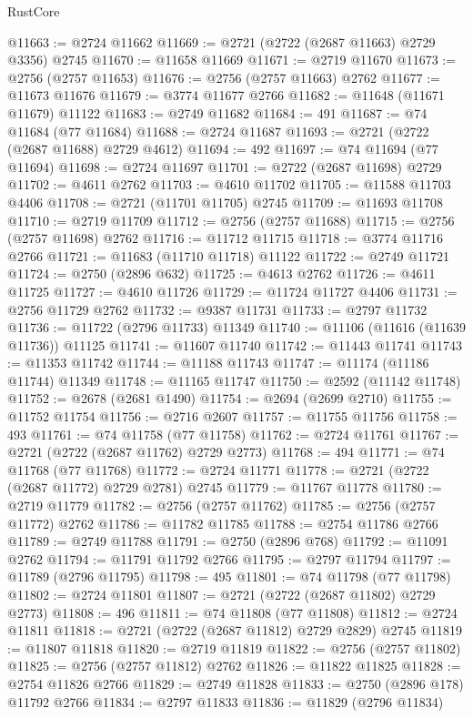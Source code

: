 \begin{lexlean}{RustCore}
\begin{coremodule}
@11663 := @2724 @11662
@11669 := @2721 (@2722 (@2687 @11663) @2729 @3356) @2745
@11670 := @11658 @11669
@11671 := @2719 @11670
@11673 := @2756 (@2757 @11653)
@11676 := @2756 (@2757 @11663) @2762
@11677 := @11673 @11676
@11679 := @3774 @11677 @2766
@11682 := @11648 (@11671 @11679) @11122
@11683 := @2749 @11682
@11684 := 491
@11687 := @74 @11684 (@77 @11684)
@11688 := @2724 @11687
@11693 := @2721 (@2722 (@2687 @11688) @2729 @4612)
@11694 := 492
@11697 := @74 @11694 (@77 @11694)
@11698 := @2724 @11697
@11701 := @2722 (@2687 @11698) @2729
@11702 := @4611 @2762
@11703 := @4610 @11702
@11705 := @11588 @11703 @4406
@11708 := @2721 (@11701 @11705) @2745
@11709 := @11693 @11708
@11710 := @2719 @11709
@11712 := @2756 (@2757 @11688)
@11715 := @2756 (@2757 @11698) @2762
@11716 := @11712 @11715
@11718 := @3774 @11716 @2766
@11721 := @11683 (@11710 @11718) @11122
@11722 := @2749 @11721
@11724 := @2750 (@2896 @632)
@11725 := @4613 @2762
@11726 := @4611 @11725
@11727 := @4610 @11726
@11729 := @11724 @11727 @4406
@11731 := @2756 @11729 @2762
@11732 := @9387 @11731
@11733 := @2797 @11732
@11736 := @11722 (@2796 @11733) @11349
@11740 := @11106 (@11616 (@11639 @11736)) @11125
@11741 := @11607 @11740
@11742 := @11443 @11741
@11743 := @11353 @11742
@11744 := @11188 @11743
@11747 := @11174 (@11186 @11744) @11349
@11748 := @11165 @11747
@11750 := @2592 (@11142 @11748)
@11752 := @2678 (@2681 @1490)
@11754 := @2694 (@2699 @2710)
@11755 := @11752 @11754
@11756 := @2716 @2607
@11757 := @11755 @11756
@11758 := 493
@11761 := @74 @11758 (@77 @11758)
@11762 := @2724 @11761
@11767 := @2721 (@2722 (@2687 @11762) @2729 @2773)
@11768 := 494
@11771 := @74 @11768 (@77 @11768)
@11772 := @2724 @11771
@11778 := @2721 (@2722 (@2687 @11772) @2729 @2781) @2745
@11779 := @11767 @11778
@11780 := @2719 @11779
@11782 := @2756 (@2757 @11762)
@11785 := @2756 (@2757 @11772) @2762
@11786 := @11782 @11785
@11788 := @2754 @11786 @2766
@11789 := @2749 @11788
@11791 := @2750 (@2896 @768)
@11792 := @11091 @2762
@11794 := @11791 @11792 @2766
@11795 := @2797 @11794
@11797 := @11789 (@2796 @11795)
@11798 := 495
@11801 := @74 @11798 (@77 @11798)
@11802 := @2724 @11801
@11807 := @2721 (@2722 (@2687 @11802) @2729 @2773)
@11808 := 496
@11811 := @74 @11808 (@77 @11808)
@11812 := @2724 @11811
@11818 := @2721 (@2722 (@2687 @11812) @2729 @2829) @2745
@11819 := @11807 @11818
@11820 := @2719 @11819
@11822 := @2756 (@2757 @11802)
@11825 := @2756 (@2757 @11812) @2762
@11826 := @11822 @11825
@11828 := @2754 @11826 @2766
@11829 := @2749 @11828
@11833 := @2750 (@2896 @178) @11792 @2766
@11834 := @2797 @11833
@11836 := @11829 (@2796 @11834)

\end{coremodule}
\end{lexlean}
